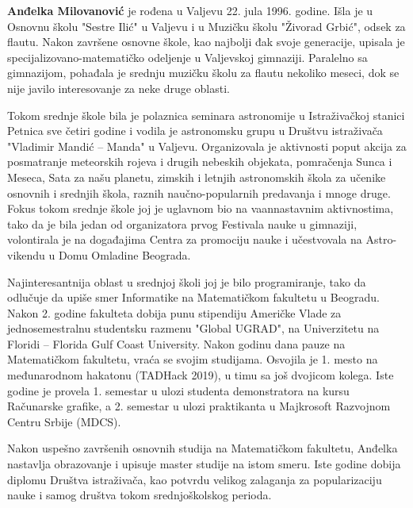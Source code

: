 \documentclass[12pt,oneside]{memoir}
\begin{document}
\literatura

\backmatter

\begin{biografija}

  \textbf{Anđelka Milovanović} je rođena u Valjevu 22. jula 1996. godine. Išla je u Osnovnu školu "Sestre Ilić" u Valjevu i u Muzičku školu "Živorad Grbić", odsek za flautu. Nakon završene osnovne škole, kao najbolji đak svoje generacije, upisala je specijalizovano-matematičko odeljenje u Valjevskoj gimnaziji. Paralelno sa gimnazijom, pohađala je srednju muzičku školu za flautu nekoliko meseci, dok se nije javilo interesovanje za neke druge oblasti. 
  
  Tokom srednje škole bila je polaznica seminara astronomije u Istraživačkoj stanici Petnica sve četiri godine i vodila je astronomsku grupu u Društvu istraživača "Vladimir Mandić -- Manda" u Valjevu. Organizovala je aktivnosti poput akcija za posmatranje meteorskih rojeva i drugih nebeskih objekata, pomračenja Sunca i Meseca, Sata za našu planetu, zimskih i letnjih astronomskih škola za učenike osnovnih i srednjih škola, raznih naučno-popularnih predavanja i mnoge druge. Fokus tokom srednje škole joj je uglavnom bio na vaannastavnim aktivnostima, tako da je bila jedan od organizatora prvog Festivala nauke u gimnaziji, volontirala je na događajima Centra za promociju nauke i učestvovala na Astro-vikendu u Domu Omladine Beograda. 
  
  Najinteresantnija oblast u srednjoj školi joj je bilo programiranje, tako da odlučuje da upiše smer Informatike na Matematičkom fakultetu u Beogradu. Nakon 2. godine fakulteta dobija punu stipendiju Američke Vlade za jednosemestralnu studentsku razmenu "Global UGRAD", na Univerzitetu na Floridi -- Florida Gulf Coast University. Nakon godinu dana pauze na Matematičkom fakultetu, vraća se svojim studijama. Osvojila je 1. mesto na međunarodnom hakatonu (TADHack 2019), u timu sa još dvojicom kolega. Iste godine je provela 1. semestar u ulozi studenta demonstratora na kursu Računarske grafike, a 2. semestar u ulozi praktikanta u Majkrosoft Razvojnom Centru Srbije (MDCS).    
  
  Nakon uspešno završenih osnovnih studija na Matematičkom fakultetu, Anđelka nastavlja obrazovanje i upisuje master studije na istom smeru. Iste godine dobija diplomu Društva istraživača, kao potvrdu velikog zalaganja za popularizaciju nauke i samog društva tokom srednjoškolskog perioda. 

\end{biografija}
\end{document}
